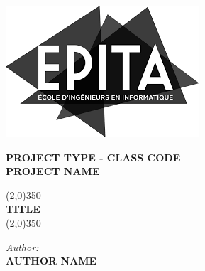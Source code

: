  \begin{titlepage}
\begin{center}
\thispagestyle{emptyt}
\vspace{2cm}
\includegraphics[scale=0.3]{./logo/epita.png}

\vspace{2cm}

\textbf{\Large PROJECT TYPE - CLASS CODE \\ PROJECT NAME}
\\[0.2cm]

\vspace{0.4cm}
\hspace{0.3cm}

\begin{center}
\line(2,0){350}\\
\vspace*{0.5cm} \textbf{{\LARGE{TITLE}}}\\
\vspace*{0.5cm}\line(2,0){350}\\
\end{center}

\hspace{0.7cm}

 \large \emph{Author:}\\
\textbf{\Large{AUTHOR NAME}} \\[1.cm]



\end{center}
\end{titlepage}
